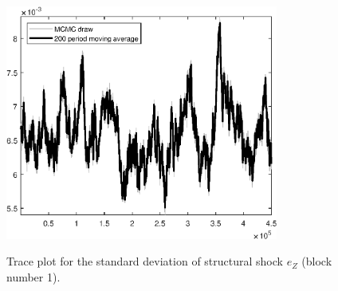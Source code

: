 \begin{figure}[H]
\centering
  \includegraphics[width=0.8\textwidth]{BRS_sectoral_wo_demand_shocks/graphs/TracePlot_SE_e_Z_blck_1}\\
    \caption{Trace plot for the standard deviation of structural shock ${e_Z}$ (block number 1).}
\end{figure}
